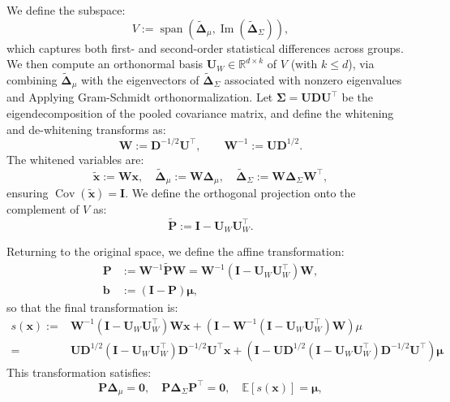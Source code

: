 \documentclass[ecta,nameyear,final]{econsocart}
\numberwithin{equation}{section}
\theoremstyle{plain}
\theoremstyle{definition}
\begin{document}
\begin{appendix}
We define the subspace:
$$
V := \operatorname{span} \left( \tilde{\boldsymbol{\Delta}}_{\mu}, \operatorname{Im}(\tilde{\boldsymbol{\Delta}}_{\Sigma}) \right),
$$
which captures both first- and second-order statistical differences across groups.
\newline \newline
We then compute an orthonormal basis $\mathbf{\mathbf{U}}_W \in \mathbb{R}^{d \times k}$ of $V$ (with $k \leq d$), via combining $\tilde{\boldsymbol{\Delta}}_{\mu}$ with the eigenvectors of $\tilde{\boldsymbol{\Delta}}_{\Sigma}$ associated with nonzero eigenvalues and Applying Gram-Schmidt orthonormalization.
\newline\newline
Let $\boldsymbol{\Sigma} = \mathbf{U} \mathbf{D} \mathbf{U}^\top$ be the eigendecomposition of the pooled covariance matrix, and define the whitening and de-whitening transforms as:
$$
\mathbf{W} := \mathbf{D}^{-1/2} \mathbf{U}^\top, \qquad \mathbf{W}^{-1} := \mathbf{U} \mathbf{D}^{1/2}.
$$
The whitened variables are:
$$
\tilde{\mathbf{x}} := \mathbf{W} \mathbf{x}, \quad \tilde{\boldsymbol{\Delta}}_{\mu} := \mathbf{W} \boldsymbol{\Delta}_{\mu}, \quad \tilde{\boldsymbol{\Delta}}_{\Sigma} := \mathbf{W} \boldsymbol{\Delta}_{\Sigma} \mathbf{W}^\top,
$$
ensuring $\operatorname{Cov}(\tilde{\mathbf{x}}) = \mathbf{I}$.
\newline \newline
We define the orthogonal projection onto the complement of $V$ as:
$$
\tilde{\mathbf{\mathbf{P}}} := \mathbf{I} - \mathbf{U}_W \mathbf{U}_W^\top.
$$

Returning to the original space, we define the affine transformation:
\begin{align*}
\mathbf{\mathbf{P}} &:= \mathbf{W}^{-1} \tilde{\mathbf{\mathbf{P}}} \mathbf{W} = \mathbf{W}^{-1} (\mathbf{I} - \mathbf{U}_W \mathbf{U}_W^\top) \mathbf{W}, \\
\mathbf{b} &:= (\mathbf{I} - \mathbf{\mathbf{P}}) \boldsymbol{\mu},
\end{align*}
so that the final transformation is:
\begin{align*}
    s(\mathbf{x}) :=& \mathbf{W}^{-1} (\mathbf{I} - \mathbf{U}_W \mathbf{U}_W^\top) \mathbf{W}\mathbf{x} + (\mathbf{I} - \mathbf{W}^{-1} (\mathbf{I} - \mathbf{U}_W \mathbf{U}_W^\top) \mathbf{W}) \mu \\
    =& \mathbf{U} \mathbf{D}^{1/2} (\mathbf{I} - \mathbf{U}_W \mathbf{U}_W^\top)  \mathbf{D}^{-1/2} \mathbf{U}^\top \mathbf{x} + (\mathbf{I} - \mathbf{U} \mathbf{D}^{1/2} (\mathbf{I} - \mathbf{U}_W \mathbf{U}_W^\top)  \mathbf{D}^{-1/2} \mathbf{U}^\top ) \boldsymbol{\mu}
\end{align*}
This transformation satisfies:
$$
\mathbf{\mathbf{P}} \boldsymbol{\Delta}_{\mu} = \mathbf{0}, \quad \mathbf{\mathbf{P}} \boldsymbol{\Delta}_{\Sigma} \mathbf{\mathbf{P}}^\top = \mathbf{0}, \quad \mathbb{E}[s(\mathbf{x})] = \boldsymbol{\mu},
$$

\end{appendix}
\end{document}
